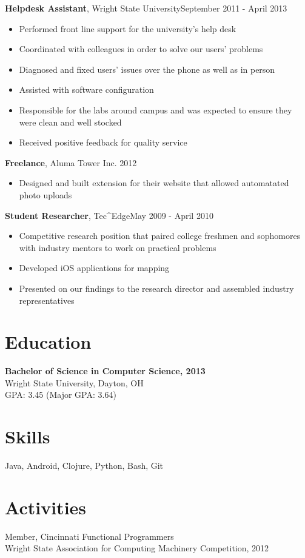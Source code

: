 \documentclass[line, margin, 10pt]{res} \setlength{\parskip}{9pt}
\begin{document}
\begin{resume}
  {\bf Helpdesk Assistant}, Wright State University\hfill September 2011 - April
  2013
  \begin{itemize} \itemsep -2pt %
  \item Performed front line support for the university's help desk
  \item Coordinated with colleagues in order to solve our users' problems
  \item Diagnosed and fixed users' issues over the phone as well as in person
  \item Assisted with software configuration
  \item Responsible for the labs around campus and was expected to ensure they
    were clean and well stocked
  \item Received positive feedback for quality service
  \end{itemize}

  {\bf Freelance}, Aluma Tower Inc. \hfill 2012
  \begin{itemize} \itemsep -2pt %
  \item Designed and built extension for their website that allowed automatated
    photo uploads
  \end{itemize}

  {\bf Student Researcher}, Tec\^{}Edge\hfill May 2009 - April 2010
  \begin{itemize} \itemsep -2pt %
  \item Competitive research position that paired college freshmen and
    sophomores with industry mentors to work on practical problems
  \item Developed iOS applications for mapping
  \item Presented on our findings to the research director and assembled
    industry representatives
  \end{itemize}


  \section{Education}
  {\bf Bachelor of Science in Computer Science, 2013}\\
  Wright State University, Dayton, OH\\
  GPA: 3.45 (Major GPA: 3.64)

\section{Skills}
Java, Android, Clojure, Python, Bash, Git

\section{Activities}
Member, Cincinnati Functional Programmers \\
Wright State Association for Computing Machinery Competition, 2012
  \\
\end{resume}
\end{document}
